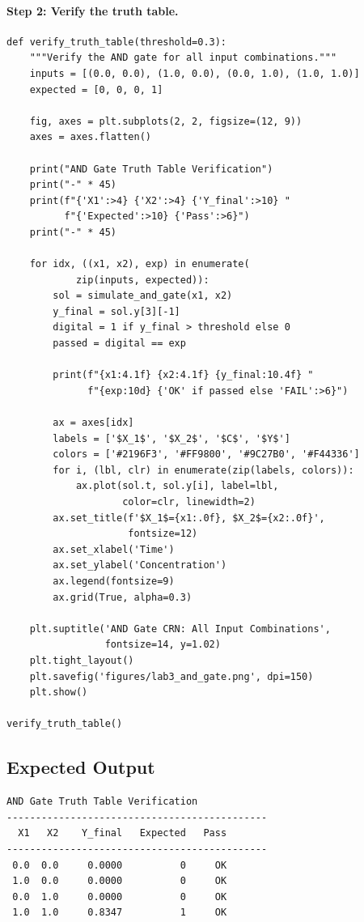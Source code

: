 \paragraph{Step 2: Verify the truth table.}

\begin{lstlisting}[style=dogmapython, caption={Lab 3: AND gate truth table verification.}]
def verify_truth_table(threshold=0.3):
    """Verify the AND gate for all input combinations."""
    inputs = [(0.0, 0.0), (1.0, 0.0), (0.0, 1.0), (1.0, 1.0)]
    expected = [0, 0, 0, 1]

    fig, axes = plt.subplots(2, 2, figsize=(12, 9))
    axes = axes.flatten()

    print("AND Gate Truth Table Verification")
    print("-" * 45)
    print(f"{'X1':>4} {'X2':>4} {'Y_final':>10} "
          f"{'Expected':>10} {'Pass':>6}")
    print("-" * 45)

    for idx, ((x1, x2), exp) in enumerate(
            zip(inputs, expected)):
        sol = simulate_and_gate(x1, x2)
        y_final = sol.y[3][-1]
        digital = 1 if y_final > threshold else 0
        passed = digital == exp

        print(f"{x1:4.1f} {x2:4.1f} {y_final:10.4f} "
              f"{exp:10d} {'OK' if passed else 'FAIL':>6}")

        ax = axes[idx]
        labels = ['$X_1$', '$X_2$', '$C$', '$Y$']
        colors = ['#2196F3', '#FF9800', '#9C27B0', '#F44336']
        for i, (lbl, clr) in enumerate(zip(labels, colors)):
            ax.plot(sol.t, sol.y[i], label=lbl,
                    color=clr, linewidth=2)
        ax.set_title(f'$X_1$={x1:.0f}, $X_2$={x2:.0f}',
                     fontsize=12)
        ax.set_xlabel('Time')
        ax.set_ylabel('Concentration')
        ax.legend(fontsize=9)
        ax.grid(True, alpha=0.3)

    plt.suptitle('AND Gate CRN: All Input Combinations',
                 fontsize=14, y=1.02)
    plt.tight_layout()
    plt.savefig('figures/lab3_and_gate.png', dpi=150)
    plt.show()

verify_truth_table()
\end{lstlisting}

\subsection{Expected Output}

\begin{lstlisting}[style=dogmapython, caption={Lab 3: Expected truth table output.}, numbers=none]
AND Gate Truth Table Verification
---------------------------------------------
  X1   X2    Y_final   Expected   Pass
---------------------------------------------
 0.0  0.0     0.0000          0     OK
 1.0  0.0     0.0000          0     OK
 0.0  1.0     0.0000          0     OK
 1.0  1.0     0.8347          1     OK
\end{lstlisting}

